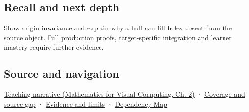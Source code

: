 \subsection{Recall and next depth}\label{appendix-0026ec42c9d5-recall-and-next-depth}

Show origin invariance and explain why a hull can fill holes absent from the source object. Full production proofs, target-specific integration and learner mastery require further evidence.

\subsection{Source and navigation}\label{appendix-0026ec42c9d5-source-and-navigation}

\href{../02-Mathematics-for-Visual-Computing/main.pdf\#nameddest=01-foundations-i-ch018-weighted-points-lead-from-affine-geometry-to-collision-shapes}{Teaching narrative (Mathematics for Visual Computing, Ch. 2)} · \hyperref[appendix-fd090d982a15-phase-6---parts-501-600]{Coverage and source gap} · \hyperref[appendix-a103e7846d21-phase-6---source-analysis-and-verification]{Evidence and limits} · \hyperref[appendix-4ad47bdd269a]{Dependency Map}
